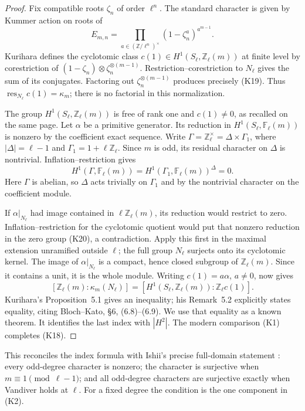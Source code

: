 \documentclass[11pt,a4paper]{article}
\theoremstyle{definition}
\begin{document}
\begin{proof}
Fix compatible roots \(\zeta_n\) of order \(\ell^n\).
The standard character is given by Kummer action on roots of
\[
 E_{m,n}=
 \prod_{a\in(\mathbb Z/\ell^n)^\times}
       (1-\zeta_n^a)^{a^{m-1}}.                    \tag{K19}
\]
Kurihara \cite[p.~233, (4)]{Kurihara1992} defines the
cyclotomic class \(c(1)\in H^1(S_\ell,\mathbb Z_\ell(m))\)
at finite level by corestriction of
\((1-\zeta_n)\otimes\zeta_n^{\otimes(m-1)}\).
Restriction--corestriction to \(N_\ell\) gives the sum
of its conjugates. Factoring out
\(\zeta_n^{\otimes(m-1)}\) produces precisely (K19).
Thus \(\operatorname{res}_{N_\ell}c(1)=\kappa_m\);
there is no factorial in this normalization.

The group \(H^1(S_\ell,\mathbb Z_\ell(m))\) is free of
rank one and \(c(1)\ne0\), as recalled on the same page.
Let \(\alpha\) be a primitive generator. Its reduction in
\(H^1(S_\ell,\mathbb F_\ell(m))\) is nonzero by the
coefficient exact sequence. Write
\(\Gamma=\mathbb Z_\ell^\times=\Delta\times\Gamma_1\),
where \(|\Delta|=\ell-1\) and \(\Gamma_1=1+\ell\mathbb Z_\ell\).
Since \(m\) is odd, its residual character on \(\Delta\)
is nontrivial. Inflation--restriction gives
\[
 H^1(\Gamma,\mathbb F_\ell(m))
 =H^1(\Gamma_1,\mathbb F_\ell(m))^\Delta=0.           \tag{K20}
\]
Here \(\Gamma\) is abelian, so \(\Delta\) acts trivially
on \(\Gamma_1\) and by the nontrivial character on the
coefficient module.

If \(\alpha|_{N_\ell}\) had image contained in
\(\ell\mathbb Z_\ell(m)\), its reduction would restrict
to zero. Inflation--restriction for the cyclotomic quotient
would put that nonzero reduction in the zero group (K20),
a contradiction. Apply this first in the maximal extension
unramified outside \(\ell\); the full group \(N_\ell\)
surjects onto its cyclotomic kernel. The image of
\(\alpha|_{N_\ell}\) is a compact, hence closed subgroup
of \(\mathbb Z_\ell(m)\). Since it contains a unit,
it is the whole module.
Writing \(c(1)=a\alpha\), \(a\ne0\), now gives
\[
 [\mathbb Z_\ell(m):\kappa_m(N_\ell)]
 =[H^1(S_\ell,\mathbb Z_\ell(m)):\mathbb Z_\ell c(1)].
\]
Kurihara's Proposition~5.1 gives an inequality; his
Remark~5.2 explicitly states equality, citing Bloch--Kato,
\S6, (6.8)--(6.9). We use that equality as a known
theorem. It identifies the last index with \(|H^2|\).
The modern comparison (K1) completes (K18).
\end{proof}

This reconciles the index formula with Ishii's precise
full-domain statement \cite[Theorem~1.1, p.~2]{IshiiKummer2024}:
every odd-degree character is nonzero; the character is
surjective when \(m\equiv1\pmod{\ell-1}\); and all odd-degree
characters are surjective exactly when Vandiver holds at
\(\ell\). For a fixed degree the condition is the one
component in (K2).
\end{document}
